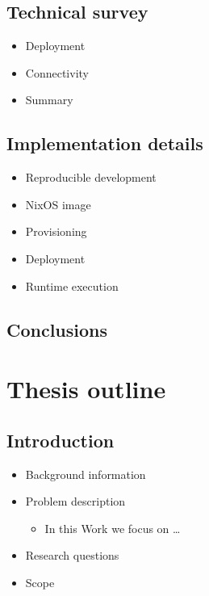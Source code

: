 \hypertarget{notes__05000-prep.md__technical-survey}{%
\section{Technical
survey}\label{notes__05000-prep.md__technical-survey}}

\begin{itemize}
\tightlist
\item
  Deployment
\item
  Connectivity
\item
  Summary
\end{itemize}

\hypertarget{notes__05000-prep.md__implementation-details}{%
\section{Implementation
details}\label{notes__05000-prep.md__implementation-details}}

\begin{itemize}
\tightlist
\item
  Reproducible development
\item
  NixOS image
\item
  Provisioning
\item
  Deployment
\item
  Runtime execution
\end{itemize}

\hypertarget{notes__05000-prep.md__conclusions}{%
\section{Conclusions}\label{notes__05000-prep.md__conclusions}}

\hypertarget{notes__06000-thesis.md}{}
\hypertarget{notes__06000-thesis.md__thesis-outline}{%
\chapter{Thesis outline}\label{notes__06000-thesis.md__thesis-outline}}

\hypertarget{notes__06000-thesis.md__introduction}{%
\section{Introduction}\label{notes__06000-thesis.md__introduction}}

\begin{itemize}
\tightlist
\item
  Background information
\item
  Problem description

  \begin{itemize}
  \tightlist
  \item
    In this Work we focus on \ldots{}
  \end{itemize}
\item
  Research questions
\item
  Scope
\end{itemize}

